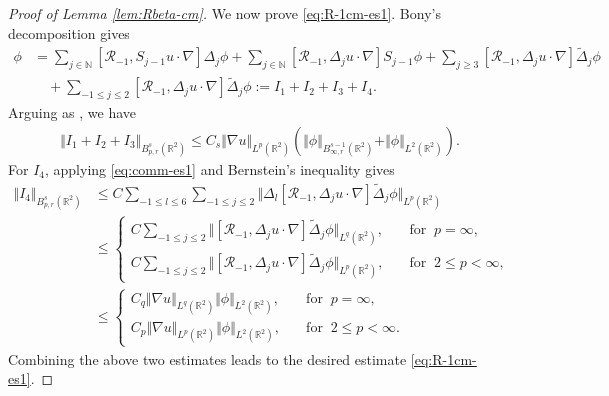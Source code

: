 \documentclass[reqno,11pt,a4paper]{amsart}
\newcommand{\NN}{\ensuremath{\mathbb{N}}}
\begin{document}
\begin{proof}[Proof of Lemma \ref{lem:Rbeta-cm}]
We now prove \eqref{eq:R-1cm-es1}.
Bony's decomposition gives
\begin{align*}
  [\mathcal{R}_{-1}, u\cdot \nabla ] \phi
  & = \sum_{j\in \NN}[\mathcal{R}_{-1}, S_{j-1}u\cdot\nabla] \Delta_j \phi
  + \sum_{j\in \NN} [\mathcal{R}_{-1}, \Delta_j u \cdot\nabla] S_{j-1}\phi
  + \sum_{j\geq 3} [\mathcal{R}_{-1}, \Delta_j u\cdot\nabla] \widetilde{\Delta}_j \phi \nonumber \\
  & \quad + \sum_{-1\leq j\leq 2} [\mathcal{R}_{-1},\Delta_j u\cdot \nabla] \widetilde{\Delta}_j\phi  := {I}_1 + {I}_2 + {I}_3 + I_4.
\end{align*}
Arguing as \cite[Lemma 2.6]{LXY25}, we have
\begin{align*}
  \Vert I_1 + I_2+I_3\Vert _{B^s_{p,r}(\mathbb{R}^2)} \leq C_s \Vert \nabla u\Vert _{L^p(\mathbb{R}^2)} \left(\Vert \phi\Vert _{B^{s-1}_{\infty,r}(\mathbb{R}^2)} + \Vert \phi\Vert _{L^2(\mathbb{R}^2)}\right) .
\end{align*}
For $I_4$, applying \eqref{eq:comm-es1} and Bernstein's inequality gives
\begin{align*}
  \Vert I_4\Vert _{B^s_{p,r}(\mathbb{R}^2)} & \leq C \sum_{-1\leq l\leq 6} 
  \sum_{-1\leq j\leq 2} \Vert \Delta_l [\mathcal{R}_{-1}, \Delta_j u 
  \cdot \nabla]\widetilde{\Delta}_j \phi\Vert _{L^p(\mathbb{R}^2)} \\
  & \leq 
  \begin{cases}
    C \sum_{-1\leq j \leq 2} \Vert [\mathcal{R}_{-1},\Delta_j u\cdot \nabla]\widetilde{\Delta}_j\phi\Vert _{L^q(\mathbb{R}^2)},
    \quad & \textrm{for}\;\; p=\infty, \\
    C \sum_{-1\leq j \leq 2} \Vert [\mathcal{R}_{-1},\Delta_j u\cdot \nabla]\widetilde{\Delta}_j\phi\Vert _{L^p(\mathbb{R}^2)},
    \quad & \textrm{for}\;\; 2\leq p<\infty, 
  \end{cases} \\
  & \leq
  \begin{cases}
    C_q \Vert \nabla u\Vert _{L^q(\mathbb{R}^2)} \Vert \phi\Vert _{L^2(\mathbb{R}^2)}, \quad & \textrm{for}\;\; p=\infty, \\
    C_p \Vert \nabla u\Vert _{L^p(\mathbb{R}^2)} \Vert \phi\Vert _{L^2(\mathbb{R}^2)}, \quad & \textrm{for}\;\; 2\leq p<\infty.
  \end{cases} 
\end{align*}
Combining the above two estimates leads to the desired estimate \eqref{eq:R-1cm-es1}.
\end{proof}
\end{document}
